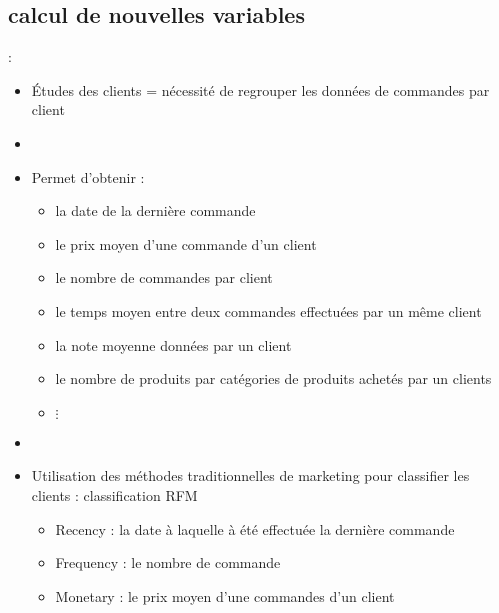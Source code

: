 \documentclass[8pt,aspectratio=169,hyperref={unicode=true}]{beamer}
\begin{document}
\subsection{calcul de nouvelles variables}
\begin{frame}{\insertsection: \insertsubsection}
    \begin{itemize}
        \item Études des clients = nécessité de regrouper les données de commandes par client
        \item[]
        \item Permet d'obtenir :
              \begin{itemize}
                  \item la date de la dernière commande
                  \item le prix moyen d'une commande d'un client
                  \item le nombre de commandes par client
                  \item le temps moyen entre deux commandes effectuées par un même client
                  \item la note moyenne données par un client
                  \item le nombre de produits par catégories de produits achetés par un clients
                  \item[] $\vdots$
              \end{itemize}
        \item[]
        \item Utilisation des méthodes traditionnelles de marketing pour classifier les clients : classification RFM
              \begin{itemize}
                  \item Recency : la date à laquelle à été effectuée la dernière commande
                  \item Frequency : le nombre de commande
                  \item Monetary : le prix moyen d'une commandes d'un client
              \end{itemize}
    \end{itemize}
\end{frame}
\end{document}
